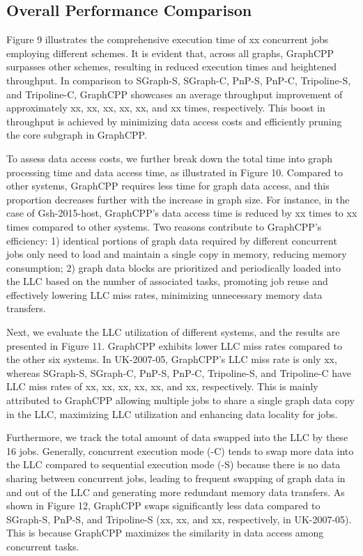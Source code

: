 \documentclass[lettersize,journal]{IEEEtran} %
\begin{document}
\subsection{Overall Performance Comparison}
Figure 9 illustrates the comprehensive execution time of xx concurrent jobs employing different schemes. It is evident that, across all graphs, GraphCPP surpasses other schemes, resulting in reduced execution times and heightened throughput. In comparison to SGraph-S, SGraph-C, PnP-S, PnP-C, Tripoline-S, and Tripoline-C, GraphCPP showcases an average throughput improvement of approximately xx, xx, xx, xx, xx, and xx times, respectively. This boost in throughput is achieved by minimizing data access costs and efficiently pruning the core subgraph in GraphCPP.

To assess data access costs, we further break down the total time into graph processing time and data access time, as illustrated in Figure 10. Compared to other systems, GraphCPP requires less time for graph data access, and this proportion decreases further with the increase in graph size. For instance, in the case of Gsh-2015-host, GraphCPP's data access time is reduced by xx times to xx times compared to other systems. Two reasons contribute to GraphCPP's efficiency: 1) identical portions of graph data required by different concurrent jobs only need to load and maintain a single copy in memory, reducing memory consumption; 2) graph data blocks are prioritized and periodically loaded into the LLC based on the number of associated tasks, promoting job reuse and effectively lowering LLC miss rates, minimizing unnecessary memory data transfers.

Next, we evaluate the LLC utilization of different systems, and the results are presented in Figure 11. GraphCPP exhibits lower LLC miss rates compared to the other six systems. In UK-2007-05, GraphCPP's LLC miss rate is only xx, whereas SGraph-S, SGraph-C, PnP-S, PnP-C, Tripoline-S, and Tripoline-C have LLC miss rates of xx, xx, xx, xx, xx, and xx, respectively. This is mainly attributed to GraphCPP allowing multiple jobs to share a single graph data copy in the LLC, maximizing LLC utilization and enhancing data locality for jobs.

Furthermore, we track the total amount of data swapped into the LLC by these 16 jobs. Generally, concurrent execution mode (-C) tends to swap more data into the LLC compared to sequential execution mode (-S) because there is no data sharing between concurrent jobs, leading to frequent swapping of graph data in and out of the LLC and generating more redundant memory data transfers. As shown in Figure 12, GraphCPP swaps significantly less data compared to SGraph-S, PnP-S, and Tripoline-S (xx, xx, and xx, respectively, in UK-2007-05). This is because GraphCPP maximizes the similarity in data access among concurrent tasks.
\end{document}
